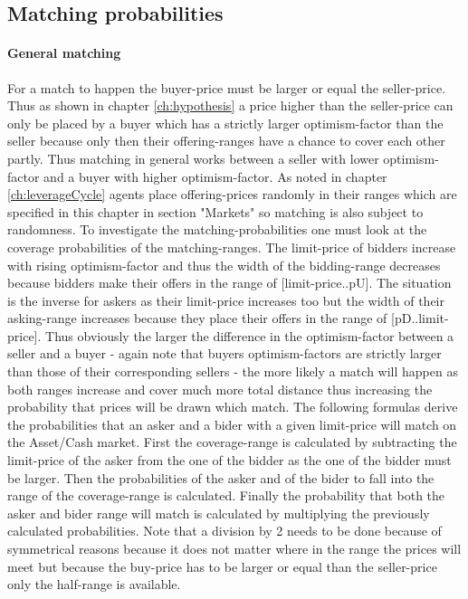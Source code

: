 \documentclass[Bachelorarbeit.tex]{subfiles}
\begin{document}
\subsection{Matching probabilities}

\paragraph{General matching}
For a match to happen the buyer-price must be larger or equal the seller-price. Thus as shown in chapter \ref{ch:hypothesis} a price higher than the seller-price can only be placed by a buyer which has a strictly larger optimism-factor than the seller because only then their offering-ranges have a chance to cover each other partly. Thus matching in general works between a seller with lower optimism-factor and a buyer with higher optimism-factor. As noted in chapter \ref{ch:leverageCycle} agents place offering-prices randomly in their ranges which are specified in this chapter in section "Markets" so matching is also subject to randomness.
\medskip
To investigate the matching-probabilities one must look at the coverage probabilities of the matching-ranges. The limit-price of bidders increase with rising optimism-factor and thus the width of the bidding-range decreases because bidders make their offers in the range of [limit-price..pU]. The situation is the inverse for askers as their limit-price increases too but the width of their asking-range increases because they place their offers in the range of [pD..limit-price]. Thus obviously the larger the difference in the optimism-factor between a seller and a buyer - again note that buyers optimism-factors are strictly larger than those of their corresponding sellers - the more likely a match will happen as both ranges increase and cover much more total distance thus increasing the probability that prices will be drawn which match.
\medskip
The following formulas derive the probabilities that an asker and a bider with a given limit-price will match on the Asset/Cash market. First the coverage-range is calculated by subtracting the limit-price of the asker from the one of the bidder as the one of the bidder must be larger. Then the probabilities of the asker and of the bider to fall into the range of the coverage-range is calculated. Finally the probability that both the asker and bider range will match is calculated by multiplying the previously calculated probabilities. Note that a division by 2 needs to be done because of symmetrical reasons because it does not matter where in the range the prices will meet but because the buy-price has to be larger or equal than the seller-price only the half-range is available.
\end{document}
